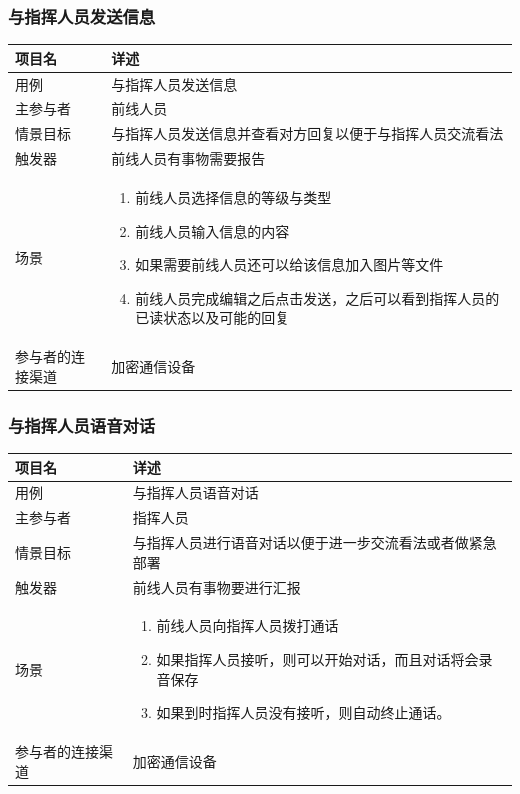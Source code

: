 \documentclass{ctexrep}
\begin{document}
\subsubsection{与指挥人员发送信息}
\begin{longtable}{p{2cm} | p{10cm}}
\hline
项目名 & 详述 \\
\hline
\hline
用例 &  与指挥人员发送信息\\
\hline
主参与者 & 前线人员  \\
\hline
情景目标 &  与指挥人员发送信息并查看对方回复以便于与指挥人员交流看法 \\
\hline
触发器 & 前线人员有事物需要报告 \\
\hline
场景 & \begin{enumerate}
	\item 前线人员选择信息的等级与类型
	\item 前线人员输入信息的内容
	\item 如果需要前线人员还可以给该信息加入图片等文件
	\item 前线人员完成编辑之后点击发送，之后可以看到指挥人员的已读状态以及可能的回复
\end{enumerate} \\
\hline
参与者的连接渠道 & 加密通信设备 \\
\hline
\end{longtable}

\subsubsection{与指挥人员语音对话}
\begin{longtable}{p{2cm} | p{10cm}}
\hline
项目名 & 详述 \\
\hline
\hline
用例 & 与指挥人员语音对话 \\
\hline
主参与者 &  指挥人员\\
\hline
情景目标 &  与指挥人员进行语音对话以便于进一步交流看法或者做紧急部署\\
\hline
触发器 & 前线人员有事物要进行汇报\\
\hline
场景 & \begin{enumerate}
	\item 前线人员向指挥人员拨打通话
	\item 如果指挥人员接听，则可以开始对话，而且对话将会录音保存
	\item 如果到时指挥人员没有接听，则自动终止通话。
\end{enumerate} \\
\hline
参与者的连接渠道 &加密通信设备 \\
\hline
\end{longtable}
\end{document}
